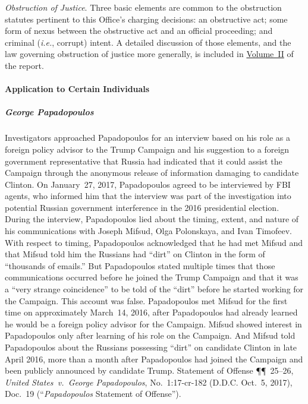 \textit{Obstruction of Justice}.
Three basic elements are common to the obstruction statutes pertinent to this Office's charging decisions: an obstructive act; some form of nexus between the obstructive act and an official proceeding; and criminal (\textit{i.e.}, corrupt) intent.
A detailed discussion of those elements, and the law governing obstruction of justice more generally, is included in \hyperlink{chapter.2}{Volume~II} of the report.

\paragraph{Application to Certain Individuals}

\subparagraph{George Papadopoulos}
Investigators approached Papadopoulos for an interview based on his role as a foreign policy advisor to the Trump Campaign and his suggestion to a foreign government representative that Russia had indicated that it could assist the Campaign through the anonymous release of information damaging to candidate Clinton.
On January~27, 2017, Papadopoulos agreed to be interviewed by FBI agents, who informed him that the interview was part of the investigation into potential Russian government interference in the 2016 presidential election.
During the interview, Papadopoulos lied about the timing, extent, and nature of his communications with Joseph Mifsud, Olga Polonskaya, and Ivan Timofeev.
With respect to timing, Papadopoulos acknowledged that he had met Mifsud and that Mifsud told him the Russians had ``dirt'' on Clinton in the form of ``thousands of emails.''
But Papadopoulos stated multiple times that those communications occurred before he joined the Trump Campaign and that it was a ``very strange coincidence'' to be told of the ``dirt'' before he started working for the Campaign.
This account was false.
Papadopoulos met Mifsud for the first time on approximately March~14, 2016, after Papadopoulos had already learned he would be a foreign policy advisor for the Campaign.
Mifsud showed interest in Papadopoulos only after learning of his role on the Campaign.
And Mifsud told Papadopoulos about the Russians possessing ``dirt'' on candidate Clinton in late April 2016, more than a month after Papadopoulos had joined the Campaign and been publicly announced by candidate Trump.
Statement of Offense \P\P~25--26, \textit{United States~v.\ George Papadopoulos}, No.~1:17-cr-182 (D.D.C. Oct.~5, 2017), Doc.~19 (``\textit{Papadopoulos} Statement of Offense'').

